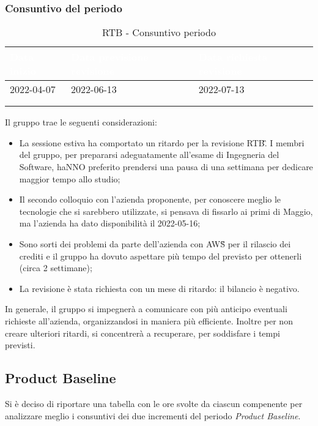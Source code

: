 {    \subsubsection{Consuntivo del periodo} {
        \setlength{\freewidth}{\dimexpr\textwidth-30\tabcolsep}
        \renewcommand{\arraystretch}{1.0}
        \setlength{\aboverulesep}{0pt}
        \setlength{\belowrulesep}{0pt}
        \begin{longtable}{C{.4\freewidth} C{.4\freewidth} C{.4\freewidth}}
        \toprule
        \textcolor{white}{\textbf{Data inizio}}&
        \textcolor{white}{\textbf{Data previsione revisione}}&
        \textcolor{white}{\textbf{Data richiesta revisione}} \\
        \toprule
        \endhead
            
        2022-04-07 & 2022-06-13 & 2022-07-13 \\
        \bottomrule
        \\
        \caption{RTB - Consuntivo periodo}
        \end{longtable}
        Il gruppo trae le seguenti considerazioni:
        \begin{itemize}
            \item La sessione estiva ha comportato un ritardo per la revisione RTB\G. I membri del gruppo,
                  per prepararsi adeguatamente all'esame di Ingegneria del Software, 
                  haNNO preferito prendersi una pausa di una settimana per dedicare maggior tempo allo studio;
            \item Il secondo colloquio con l'azienda proponente, per conoscere meglio le tecnologie che si sarebbero 
                  utilizzate, si pensava di fissarlo ai primi di Maggio, ma l'azienda ha dato disponibilità 
                  il 2022-05-16;
            \item Sono sorti dei problemi da parte dell'azienda con AWS\G{} per il rilascio dei crediti e il gruppo ha dovuto aspettare 
                  più tempo del previsto per ottenerli (circa 2 settimane);
            \item La revisione è stata richiesta con un mese di ritardo: il bilancio è negativo.
        \end{itemize}
        In generale, il gruppo si impegnerà a comunicare con più anticipo eventuali richieste all'azienda, organizzandosi 
        in maniera più efficiente. Inoltre per non creare ulteriori ritardi, si concentrerà a recuperare, per soddisfare i tempi previsti. 
    }
    \subsection{Product Baseline} {
        Si è deciso di riportare una tabella con le ore svolte da ciascun compenente per analizzare meglio 
        i consuntivi dei due incrementi del periodo \textit{Product Baseline}.
}}
